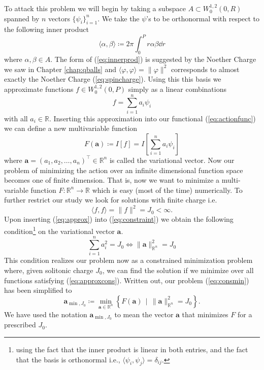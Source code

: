 To attack this problem we will begin by taking a subspace $A\subset W^{1,2}_0(0,R)$ spanned by $n$ vectors $\{\psi_i\}_{i = 1}^n$. We take the $\psi$'s to be orthonormal with respect to the following inner product
\begin{equation}\label{eq:innerprod}
\langle\alpha,\beta\rangle\coloneqq 2\pi\int_0^P r\alpha\beta\dd{r}
\end{equation}
where $\alpha,\beta\in A$.
The form of (\ref{eq:innerprod}) is suggested by the Noether Charge we saw in Chapter \ref{chap:qballs} and $\langle\varphi,\varphi\rangle = \|\varphi\|^2$ corresponds to almost exactly the Noether Charge (\ref{eq:spincharge}). Using this this basis we approximate functions $f \in W_0^{1,2}(0, P)$ simply as a linear combinations
\begin{equation}\label{eq:approx}
f = \sum_{i = 1}^na_i\psi_i
\end{equation}
with all $a_i\in \mathbb{R}$. Inserting this approximation into our functional (\ref{eq:actionfunc}) we can define a new multivariable function
\begin{equation}\label{eq:objfun}
F(\mathbf{a}) \coloneqq I[f] = I\!\left[\sum_{i = 1}^na_i\psi_i\right]
\end{equation}
where $\mathbf{a} = (a_1, a_2,\ldots, a_n)^\intercal\in \mathbb{R}^n$ is called the variational vector. Now our problem of minimizing the action over an infinite dimensional function space becomes one of finite dimension. That is, now we want to minimize a multi-variable function $F:\mathbb{R}^n\to\mathbb{R}$ which is easy (most of the time) numerically. To further restrict our study we look for solutions with finite charge i.e.
\begin{equation}\label{eq:constraint}
\langle f, f \rangle = \|f\|^2 = J_0 < \infty.
\end{equation}
Upon inserting (\ref{eq:approx}) into (\ref{eq:constraint}) we obtain the following condition\footnote{using the fact that the inner product is linear in both entries, and the fact that the basis is orthonormal i.e., $\langle \psi_i,\psi_j\rangle = \delta_{ij}$.} on the variational vector $\mathbf{a}$.
\begin{equation}\label{eq:approxcons}
\sum_{i = 1}^na_i^2 = J_0 \iff \|\mathbf{a}\|^2_{\mathbb{R}^n} = J_0
\end{equation}
This condition realizes our problem now as a constrained minimization problem where, given solitonic charge $J_0$, we can find the solution if we minimize over all functions satisfying (\ref{eq:approxcons}). Written out, our problem (\ref{eq:consmin}) has been simplified to
\begin{equation}\label{eq:problem}
\mathbf{a}_{\min, J_0}\coloneqq \min_{\mathbf{a}\in\mathbb{R}^n}\left\{F(\mathbf{a}) \,\mid\, \|\mathbf{a}\|^2_{\mathbb{R}^n} = J_0\right\}.
\end{equation}
We have used the notation $\mathbf{a}_{\min, J_0}$ to mean the vector $\mathbf{a}$ that minimizes $F$ for a prescribed $J_0$.

